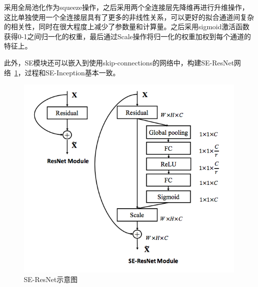 采用全局池化作为squeeze操作，之后采用两个全连接层先降维再进行升维操作，这比单独使用一个全连接层具有了更多的非线性关系，可以更好的拟合通道间复杂的相关性，同时在很大程度上减少了参数量和计算量。之后采用sigmoid激活函数获得0-1之间归一化的权重，最后通过Scale操作将归一化的权重加权到每个通道的特征上。

此外，SE模块还可以嵌入到使用skip-connections的网络中，构建SE-ResNet网络~\ref{fig:SE-ResNet}，过程和SE-Inception基本一致。

\begin{figure}[htbp!]
	\centering
	\includegraphics[width=0.5\linewidth]{readings_figures/SE_ResNet_module.png}
	\caption{SE-ResNet示意图}
	\label{fig:SE-ResNet}
\end{figure}

